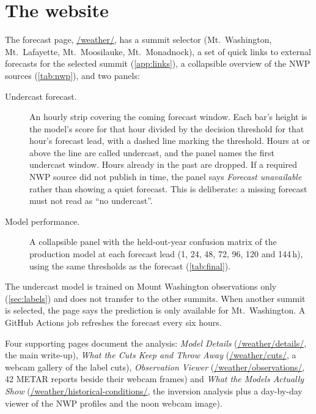 \documentclass[11pt]{article}
\begin{document}
\section{The website}\label{sec:site}
The forecast page, \url{/weather/}, has a summit selector (Mt.\ Washington, Mt.\ Lafayette,
Mt.\ Moosilauke, Mt.\ Monadnock), a set of quick links to external forecasts for the selected summit
(\cref{app:links}), a collapsible overview of the NWP sources (\cref{tab:nwp}), and two panels:
\begin{description}
\item[Undercast forecast.] An hourly strip covering the coming forecast window. Each bar's height is
  the model's score for that hour divided by the decision threshold for that hour's forecast lead,
  with a dashed line marking the threshold. Hours at or above the line are called undercast, and the
  panel names the first undercast window. Hours already in the past are dropped. If a required NWP
  source did not publish in time, the panel says \emph{Forecast unavailable} rather than showing a
  quiet forecast. This is deliberate: a missing forecast must not read as ``no undercast''.
\item[Model performance.] A collapsible panel with the held-out-year confusion matrix of the
  production model at each forecast lead (1, 24, 48, 72, 96, 120 and 144\,h), using the same
  thresholds as the forecast (\cref{tab:final}).
\end{description}
The undercast model is trained on Mount Washington observations only (\cref{sec:labels}) and does
not transfer to the other summits. When another summit is selected, the page says the prediction is
only available for Mt.\ Washington. A GitHub Actions job refreshes the forecast every six hours.

Four supporting pages document the analysis: \emph{Model Details} (\url{/weather/details/}, the main
write-up), \emph{What the Cuts Keep and Throw Away} (\url{/weather/cuts/}, a webcam gallery of the
label cuts), \emph{Observation Viewer} (\url{/weather/observations/}, 42 METAR reports beside their
webcam frames) and \emph{What the Models Actually Show}
(\url{/weather/historical-conditions/}, the inversion analysis plus a day-by-day viewer of the
NWP profiles and the noon webcam image).
\end{document}

